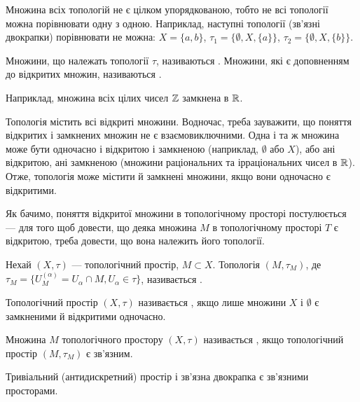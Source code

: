 \begin{remark}
Множина всіх топологій не є цілком
упорядкованою, тобто не всі топології можна порівнювати
одну з одною. Наприклад, наступні топології (зв’язні
двокрапки) порівнювати не можна: $X = \{a, b\}$,
$\tau_1 = \{\emptyset, X, \{a\}\}$, $\tau_2 = \{\emptyset, X, \{b\}\}$.
\end{remark}

\begin{definition}
Множини, що належать топології $\tau$,
називаються . Множини, які є доповненням до
відкритих множин, називаються .
\end{definition}

Наприклад, множина всіх цілих чисел $\mathbb{Z}$ замкнена в $\mathbb{R}$.

\begin{remark}
Топологія містить всі відкриті
множини. Водночас, треба зауважити, що поняття
відкритих і замкнених множин не є взаємовиключними.
Одна і та ж множина може бути одночасно і відкритою і
замкненою (наприклад, $\emptyset$ або $X$), або ані відкритою, ані
замкненою (множини раціональних та ірраціональних чисел
в $\mathbb{R}$). Отже, топологія може містити й замкнені множини,
якщо вони одночасно є відкритими.
\end{remark}

Як бачимо, поняття відкритої множини в топологічному
просторі постулюється --- для того щоб довести, що деяка
множина $M$ в топологічному просторі $T$ є відкритою, треба
довести, що вона належить його топології.

\begin{definition}
Нехай $(X, \tau)$ --- топологічний простір, $M \subset X$.
Топологія $(M, \tau_M)$, де
$\tau_M = \{ U_M^{(\alpha)} = U_\alpha \cap M, U_\alpha \in \tau\}$,
називається .
\end{definition}

\begin{definition}
Топологічний простір $(X, \tau)$ називається
, якщо лише множини $X$ і $\emptyset$ є замкненими й
відкритими одночасно.
\end{definition}

\begin{definition}
Множина $M$ топологічного простору $(X, \tau)$
називається , якщо топологічний простір $(M, \tau_M)$
є зв’язним.
\end{definition}

\begin{example}
Тривіальний (антидискретний) простір і
зв’язна двокрапка є зв’яз\-ними просторами.
\end{example}

